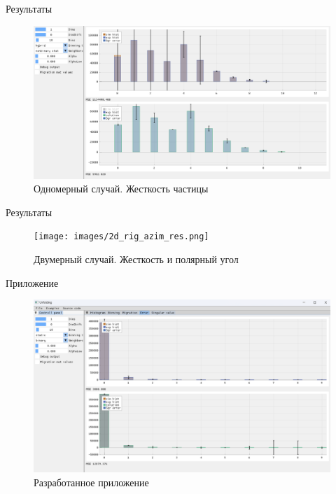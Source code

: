 \documentclass[fullscreen=true,russian,compress,%
	hyperref={unicode,bookmarks=false}]{presentation}
\begin{document}
\begin{frame}{Результаты}
   \begin{figure}[h!]
      \centering
      \includegraphics[width=\linewidth]{images/1d_rig_res.png}
      \caption{Одномерный случай. Жесткость частицы}
   \end{figure}
   
\end{frame}

\begin{frame}{Результаты}
   \begin{figure}[h!]
      \centering
      \texttt{[image: images/2d\_rig\_azim\_res.png]}
      \caption{Двумерный случай. Жесткость и полярный угол}
   \end{figure}
\end{frame}

\begin{frame}{Приложение}
   \begin{figure}[h!]
      \centering
      \includegraphics[width=\linewidth]{images/app_example.png}
      \caption{Разработанное приложение}
   \end{figure}
\end{frame}
\end{document}
